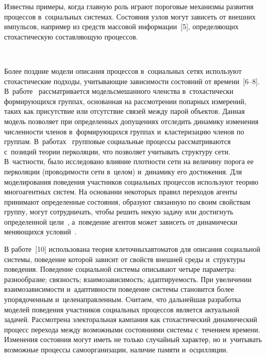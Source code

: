 \begin{multicols}{2}
Известны примеры, когда главную роль играют 
пороговые механизмы развития процессов в~социальных сис\-те\-мах. Состояния 
узлов могут зависеть от внеш\-них импульсов, например из средств массовой 
информации~[5], опре\-де\-ля\-ющих стохастическую со\-став\-ля\-ющую процессов. 

\begin{figure*}[b] %
\vspace*{-6pt}
\begin{center}
 \mbox{%
 \epsfxsize=163mm 
 }
 \end{center}
\vspace*{-9pt}
\end{figure*}

Более поздние модели описания процессов в~социальных сетях используют 
стохастические подходы, учитывающие зависимости состояний от  
вре\-мени~[6--8]. В~работе~\cite{6-sig} рассматривается модель\linebreak смешанного 
членства в~стохастически фор\-ми\-ру\-ющих\-ся группах, основанная на 
рассмотрении попарных измерений, таких как присутствие или отсутствие 
связей между парой объектов. Данная \mbox{модель} позволяет при определенных 
допущениях отследить динамику изменения численности членов 
в~формирующихся группах и~кластеризацию членов по группам. 
В~работах~\cite{7-sig, 8-sig} групповые социальные процессы рассматриваются 
с~позиций теории перколяции, что позволяет учитывать структуру сети. 
В~част\-ности, было исследовано влияние плотности сети на величину порога 
ее перколяции (проводимости сети в~целом) и~динамику его достижения. Для 
моделирования поведения участников социальных процессов используют 
теорию многоагентных систем. На основании некоторых правил переходов 
агенты принимают определенные состояния, образуют связанную по своим 
свойствам группу, могут сотрудничать, чтобы решить некую задачу или 
достигнуть определенной цели~\cite{7-sig}, а~поведение агентов может 
зависеть от динамически меняющихся условий~\cite{9-sig}. 
    
    В работе~[10] использована теория клеточных\linebreak автоматов для описания 
социальной системы, пове\-де\-ние которой зависит от свойств внешней среды 
и~структуры поведения. Поведение соци\-аль\-ной системы описывают четыре 
параметра: разнообразие; связность; взаимозависимость; адап\-ти\-ру\-емость. При 
увеличении взаимозависимости и~адап\-тив\-ности поведение сис\-те\-мы становится 
более упорядоченным и~целенаправленным. Считаем, что дальнейшая 
разработка моделей поведения участников социальных процессов является 
актуальной задачей. Рассмотрена электоральная кампания как стохастический 
динамический процесс перехода между возможными состояниями системы 
с~течением времени. Изменения состояния могут иметь не только случайный 
характер, но и~учитывать возможные процессы самоорганизации, наличие 
памяти и~осцилляции.
    

\end{multicols}
